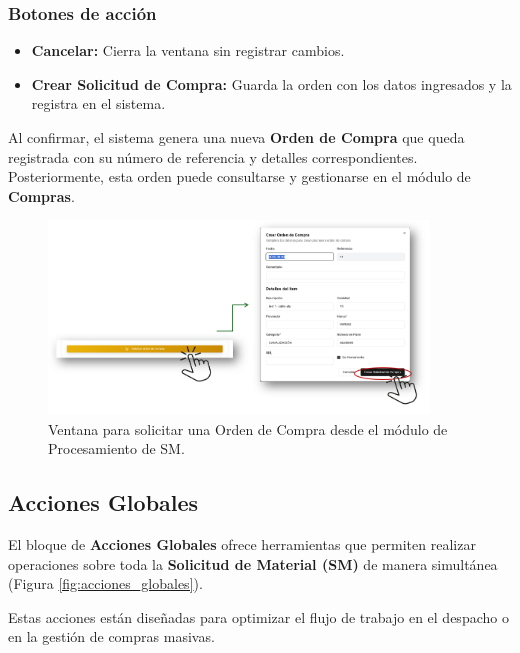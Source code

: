 \subsubsection*{Botones de acción}
\begin{itemize}
    \item \textbf{Cancelar:} Cierra la ventana sin registrar cambios.
    \item \textbf{Crear Solicitud de Compra:} Guarda la orden con los datos ingresados y la registra en el sistema.
\end{itemize}

Al confirmar, el sistema genera una nueva \textbf{Orden de Compra} que queda registrada con su número de referencia y detalles correspondientes.  
Posteriormente, esta orden puede consultarse y gestionarse en el módulo de \textbf{Compras}.

\begin{figure}[H]
    \centering
    \includegraphics[width=0.9\textwidth]{imgs/Almacen_General/Procesamiento_SM/orden de compra.png}
    \caption{Ventana para solicitar una Orden de Compra desde el módulo de Procesamiento de SM.}
    \label{fig:orden_compra}
\end{figure}


\subsection{Acciones Globales}

\vspace{-0.5em} %

El bloque de \textbf{Acciones Globales} ofrece herramientas que permiten realizar operaciones sobre toda la \textbf{Solicitud de Material (SM)} de manera simultánea (Figura \ref{fig:acciones_globales}).  

Estas acciones están diseñadas para optimizar el flujo de trabajo en el despacho o en la gestión de compras masivas.

